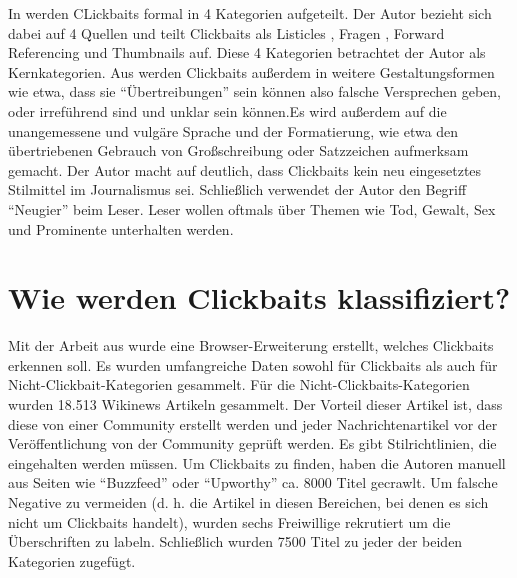 In \cite*[70-71]{Hrsg2020} werden CLickbaits formal in 4 Kategorien aufgeteilt. Der Autor bezieht sich dabei auf 4 Quellen und teilt Clickbaits als Listicles \cite*{Vijgen2014}, Fragen \cite*{Lai2014}, Forward Referencing \cite*{Blom2015} und Thumbnails \cite*{Zannettou2018} auf. Diese 4 Kategorien betrachtet der Autor als Kernkategorien. Aus \cite*[71]{Hrsg2020} werden Clickbaits außerdem in weitere Gestaltungsformen wie etwa, dass sie \enquote{Übertreibungen} sein können also falsche Versprechen geben, oder irreführend sind und unklar sein können.Es wird außerdem auf die unangemessene und vulgäre Sprache und der Formatierung, wie etwa den übertriebenen Gebrauch von Großschreibung oder Satzzeichen aufmerksam gemacht. Der Autor macht auf \cite*[75-76]{Hrsg2020} deutlich, dass Clickbaits kein neu eingesetztes Stilmittel im Journalismus sei. Schließlich verwendet der Autor den Begriff \enquote{Neugier} beim Leser. Leser wollen oftmals über Themen wie Tod, Gewalt, Sex und Prominente \cite*{Tenenboim2015} unterhalten werden.




\section{Wie werden Clickbaits klassifiziert?}
Mit der Arbeit aus \cite*{Chakrabortya} wurde eine Browser-Erweiterung erstellt, welches Clickbaits erkennen soll. Es wurden umfangreiche Daten sowohl für Clickbaits als auch für Nicht-Clickbait-Kategorien gesammelt. Für die Nicht-Clickbaits-Kategorien wurden 18.513 Wikinews Artikeln gesammelt. Der Vorteil dieser Artikel ist, dass diese von einer Community erstellt werden und jeder Nachrichtenartikel vor der Veröffentlichung von der Community geprüft werden. Es gibt Stilrichtlinien, die eingehalten werden müssen. Um Clickbaits zu finden, haben die Autoren manuell aus Seiten wie \enquote{Buzzfeed} oder \enquote{Upworthy} ca. 8000 Titel gecrawlt. Um falsche Negative zu vermeiden (d. h. die Artikel in diesen Bereichen, bei denen es sich nicht um Clickbaits handelt), wurden sechs Freiwillige rekrutiert um die Überschriften zu labeln. Schließlich wurden 7500 Titel zu jeder der beiden Kategorien zugefügt.



